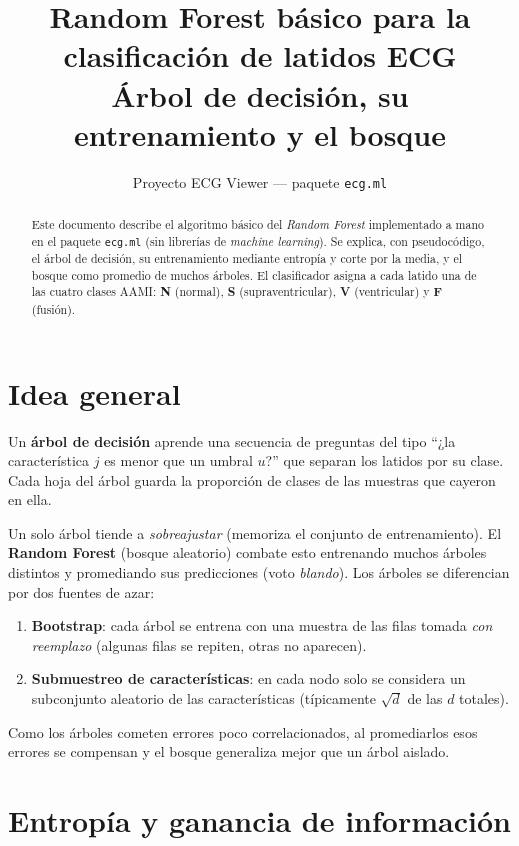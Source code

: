 \documentclass[11pt,a4paper]{article}
\title{Random Forest básico para la clasificación de latidos ECG\\
\large Árbol de decisión, su entrenamiento y el bosque}
\author{Proyecto ECG Viewer --- paquete \texttt{ecg.ml}}
\date{}
\begin{document}
\maketitle

\begin{abstract}
Este documento describe el algoritmo básico del \emph{Random Forest} implementado a mano en
el paquete \texttt{ecg.ml} (sin librerías de \emph{machine learning}). Se explica, con
pseudocódigo, el árbol de decisión, su entrenamiento mediante entropía y corte por la media, y
el bosque como promedio de muchos árboles. El clasificador asigna a cada latido una de las
cuatro clases AAMI: \textbf{N} (normal), \textbf{S} (supraventricular), \textbf{V}
(ventricular) y \textbf{F} (fusión).
\end{abstract}

\section{Idea general}

Un \textbf{árbol de decisión} aprende una secuencia de preguntas del tipo
``¿la característica $j$ es menor que un umbral $u$?'' que separan los latidos por su clase. Cada
hoja del árbol guarda la proporción de clases de las muestras que cayeron en ella.

Un solo árbol tiende a \emph{sobreajustar} (memoriza el conjunto de entrenamiento). El
\textbf{Random Forest} (bosque aleatorio) combate esto entrenando muchos árboles distintos y
promediando sus predicciones (voto \emph{blando}). Los árboles se diferencian por dos fuentes de
azar:
\begin{enumerate}
  \item \textbf{Bootstrap}: cada árbol se entrena con una muestra de las filas tomada
        \emph{con reemplazo} (algunas filas se repiten, otras no aparecen).
  \item \textbf{Submuestreo de características}: en cada nodo solo se considera un subconjunto
        aleatorio de las características (típicamente $\sqrt{d}$ de las $d$ totales).
\end{enumerate}
Como los árboles cometen errores poco correlacionados, al promediarlos esos errores se
compensan y el bosque generaliza mejor que un árbol aislado.

\section{Entropía y ganancia de información}
\end{document}
